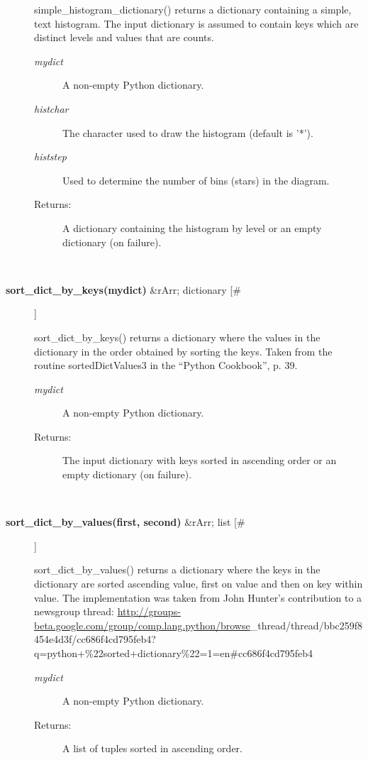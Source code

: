 \documentclass[10pt]{article}
\begin{document}
\begin{description}
 simple\_histogram\_dictionary() returns a dictionary containing a simple, text histogram. The input dictionary is assumed to contain keys which are distinct levels and values that are counts.
\begin{description}
\item[\emph{mydict}
] A non-empty Python dictionary.
\item[\emph{histchar}
] The character used to draw the histogram (default is '*').
\item[\emph{histstep}
] Used to determine the number of bins (stars) in the diagram.
\item[Returns:] A dictionary containing the histogram by level or an empty dictionary (on failure).

\end{description}
\\ 

\item[\textbf{sort\_dict\_by\_keys(mydict)}
 \&rArr; dictionary [\#]]

 sort\_dict\_by\_keys() returns a dictionary where the values in the dictionary in the order obtained by sorting the keys. Taken from the routine sortedDictValues3 in the ``Python Cookbook'', p. 39.
\begin{description}
\item[\emph{mydict}
] A non-empty Python dictionary.
\item[Returns:] The input dictionary with keys sorted in ascending order or an empty dictionary (on failure).

\end{description}
\\ 

\item[\textbf{sort\_dict\_by\_values(first, second)}
 \&rArr; list [\#]]

 sort\_dict\_by\_values() returns a dictionary where the keys in the dictionary are sorted ascending value, first on value and then on key within value. The implementation was taken from John Hunter's contribution to a newsgroup thread: \url{http://groups-beta.google.com/group/comp.lang.python/browse}\_thread/thread/bbc259f8454e4d3f/cc686f4cd795feb4?q=python+\%22sorted+dictionary\%22=1=en\#cc686f4cd795feb4 
\begin{description}
\item[\emph{mydict}
] A non-empty Python dictionary.
\item[Returns:] A list of tuples sorted in ascending order.


\end{description}
\end{description}
\end{document}
